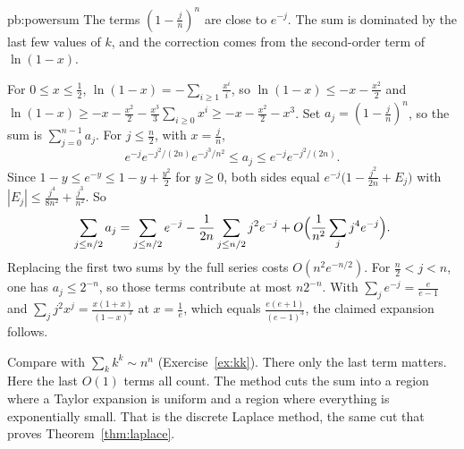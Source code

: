 \begin{solution}{pb:powersum}
\idea The terms $(1-\frac jn)^n$ are close to $e^{-j}$. The sum is dominated by the last few values of $k$, and the correction comes from the second-order term of $\ln(1-x)$.

\writeup For $0\le x\le\frac12$, $\ln(1-x)=-\sum_{i\ge1}\frac{x^i}i$, so $\ln(1-x)\le-x-\frac{x^2}2$ and $\ln(1-x)\ge-x-\frac{x^2}2-\frac{x^3}3\sum_{i\ge0}x^i\ge-x-\frac{x^2}2-x^3$. Set $a_j=(1-\frac jn)^n$, so the sum is $\sum_{j=0}^{n-1}a_j$. For $j\le\frac n2$, with $x=\frac jn$,
\[
e^{-j}e^{-j^2/(2n)}e^{-j^3/n^2}\le a_j\le e^{-j}e^{-j^2/(2n)}.
\]
Since $1-y\le e^{-y}\le1-y+\frac{y^2}2$ for $y\ge0$, both sides equal $e^{-j}\bigl(1-\frac{j^2}{2n}+E_j\bigr)$ with $|E_j|\le\frac{j^4}{8n^2}+\frac{j^3}{n^2}$. So
\[
\sum_{j\le n/2}a_j=\sum_{j\le n/2}e^{-j}-\frac1{2n}\sum_{j\le n/2}j^2e^{-j}+O\Bigl(\frac1{n^2}\sum_jj^4e^{-j}\Bigr).
\]
Replacing the first two sums by the full series costs $O(n^2e^{-n/2})$. For $\frac n2<j<n$, one has $a_j\le2^{-n}$, so those terms contribute at most $n2^{-n}$. With $\sum_je^{-j}=\frac e{e-1}$ and $\sum_jj^2x^j=\frac{x(1+x)}{(1-x)^3}$ at $x=\frac1e$, which equals $\frac{e(e+1)}{(e-1)^3}$, the claimed expansion follows.

\leads Compare with $\sum_kk^k\sim n^n$ (Exercise~\ref{ex:kk}). There only the last term matters. Here the last $O(1)$ terms all count. The method cuts the sum into a region where a Taylor expansion is uniform and a region where everything is exponentially small. That is the discrete Laplace method, the same cut that proves Theorem~\ref{thm:laplace}.
\end{solution}

